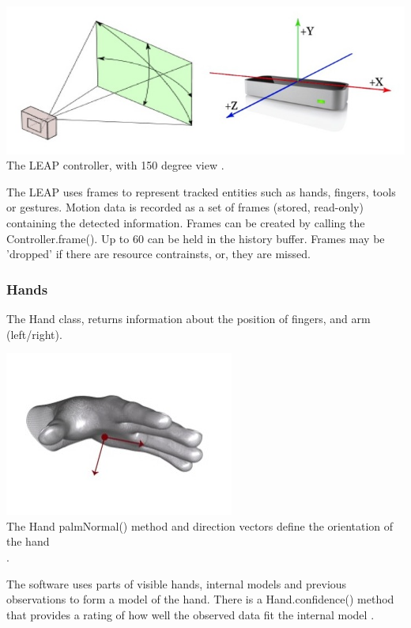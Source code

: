 \documentclass[a4paper, 11pt]{article}
\begin{document}
\begin{center}
\includegraphics[scale=0.5]{leap}\\
The LEAP controller, with 150 degree view \cite{leap}.
\end{center}

The LEAP uses frames to represent tracked entities such as hands, fingers, tools or gestures. Motion data is recorded as a set of frames (stored, read-only) containing the detected information. Frames can be created by calling the Controller.frame(). Up to 60 can be held in the history buffer. Frames may be 'dropped' if there are resource contrainsts, or, they are missed.

\subsubsection{Hands}
The Hand class, returns information about the position of fingers, and arm (left/right).

\begin{center}
\includegraphics[scale=0.6]{palm}\\
The Hand palmNormal() method and direction vectors define the orientation of the hand \cite{leap}\\.
\end{center}

The software uses parts of visible hands, internal models and previous observations to form a model of the hand. There is a Hand.confidence() method that provides a rating of how well the observed data fit the internal model \cite{leap}.
\end{document}
